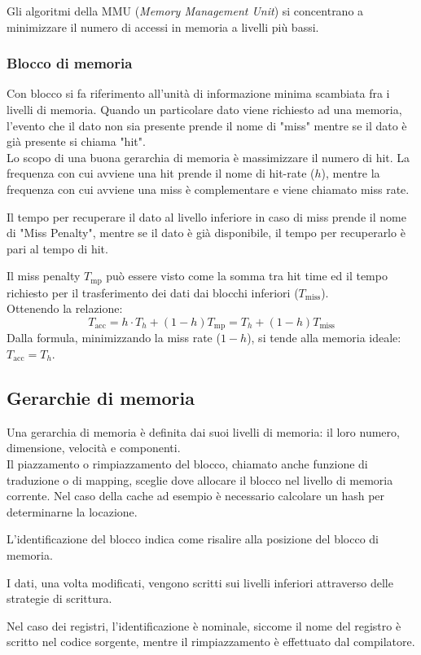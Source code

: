 \documentclass[../template]{subfiles}
\begin{document}
Gli algoritmi della MMU (\textit{Memory Management Unit}) si concentrano a minimizzare il numero di accessi in memoria a livelli più bassi.


\subsubsection{Blocco di memoria}
Con blocco si fa riferimento all'unità di informazione minima scambiata fra i livelli di memoria.
Quando un particolare dato viene richiesto ad una memoria, l'evento che il dato non sia presente prende il nome di "miss" mentre se il dato è già presente si chiama "hit".
\\
Lo scopo di una buona gerarchia di memoria è massimizzare il numero di hit. La frequenza con cui avviene una hit prende il nome di hit-rate ($h$), mentre la frequenza con cui avviene una miss è complementare
e viene chiamato miss rate.

Il tempo per recuperare il dato al livello inferiore in caso di miss prende il nome di "Miss Penalty", mentre se il dato è già disponibile, il tempo per recuperarlo è pari al tempo di hit.

Il miss penalty $T_\text{mp}$ può essere visto come la somma tra hit time ed il tempo richiesto per il trasferimento dei dati dai blocchi inferiori ($T_\text{miss}$).
\\
Ottenendo la relazione:
\[
    T_\text{acc} = h \cdot T_h + (1-h) T_\text{mp} = T_h + (1 -h) T_\text{miss}
\]
Dalla formula, minimizzando la miss rate ($1 -h$), si tende alla memoria ideale: $T_\text{acc} = T_h$.


\subsection{Gerarchie di memoria}
Una gerarchia di memoria è definita dai suoi livelli di memoria: il loro numero, dimensione, velocità e componenti.
\\
Il piazzamento o rimpiazzamento del blocco, chiamato anche funzione di traduzione o di mapping, sceglie dove allocare il blocco nel livello di memoria corrente.  Nel caso della cache ad esempio è necessario calcolare un hash per determinarne la locazione.

L'identificazione del blocco indica come risalire alla posizione del blocco di memoria.


I dati, una volta modificati, vengono scritti sui livelli inferiori attraverso delle strategie di scrittura.

Nel caso dei registri, l'identificazione è nominale, siccome il nome del registro è scritto nel codice sorgente,  mentre il rimpiazzamento è effettuato dal compilatore.
\end{document}
